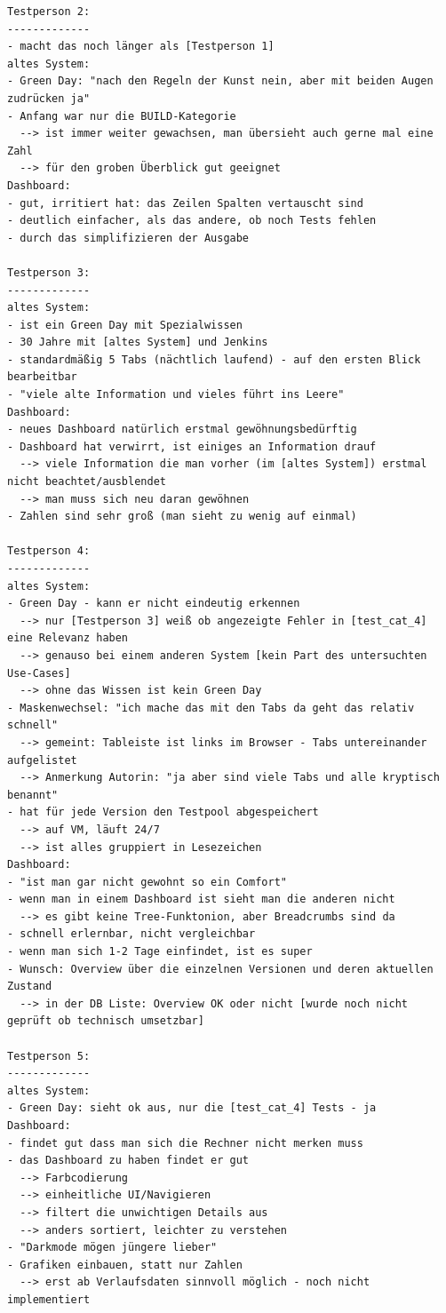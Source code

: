 \begin{lstlisting}[language={[LaTeX]TeX},inputencoding={utf8}]
Testperson 2:
-------------
- macht das noch länger als [Testperson 1]
altes System:
- Green Day: "nach den Regeln der Kunst nein, aber mit beiden Augen zudrücken ja"
- Anfang war nur die BUILD-Kategorie
  --> ist immer weiter gewachsen, man übersieht auch gerne mal eine Zahl
  --> für den groben Überblick gut geeignet
Dashboard:
- gut, irritiert hat: das Zeilen Spalten vertauscht sind
- deutlich einfacher, als das andere, ob noch Tests fehlen
- durch das simplifizieren der Ausgabe

Testperson 3:
-------------
altes System:
- ist ein Green Day mit Spezialwissen
- 30 Jahre mit [altes System] und Jenkins
- standardmäßig 5 Tabs (nächtlich laufend) - auf den ersten Blick bearbeitbar
- "viele alte Information und vieles führt ins Leere"
Dashboard:
- neues Dashboard natürlich erstmal gewöhnungsbedürftig
- Dashboard hat verwirrt, ist einiges an Information drauf
  --> viele Information die man vorher (im [altes System]) erstmal nicht beachtet/ausblendet
  --> man muss sich neu daran gewöhnen
- Zahlen sind sehr groß (man sieht zu wenig auf einmal)

Testperson 4:
-------------
altes System:
- Green Day - kann er nicht eindeutig erkennen
  --> nur [Testperson 3] weiß ob angezeigte Fehler in [test_cat_4] eine Relevanz haben
  --> genauso bei einem anderen System [kein Part des untersuchten Use-Cases]
  --> ohne das Wissen ist kein Green Day
- Maskenwechsel: "ich mache das mit den Tabs da geht das relativ schnell"
  --> gemeint: Tableiste ist links im Browser - Tabs untereinander aufgelistet
  --> Anmerkung Autorin: "ja aber sind viele Tabs und alle kryptisch benannt"
- hat für jede Version den Testpool abgespeichert
  --> auf VM, läuft 24/7
  --> ist alles gruppiert in Lesezeichen
Dashboard:
- "ist man gar nicht gewohnt so ein Comfort"
- wenn man in einem Dashboard ist sieht man die anderen nicht
  --> es gibt keine Tree-Funktonion, aber Breadcrumbs sind da
- schnell erlernbar, nicht vergleichbar
- wenn man sich 1-2 Tage einfindet, ist es super
- Wunsch: Overview über die einzelnen Versionen und deren aktuellen Zustand
  --> in der DB Liste: Overview OK oder nicht [wurde noch nicht geprüft ob technisch umsetzbar]

Testperson 5:
-------------
altes System:
- Green Day: sieht ok aus, nur die [test_cat_4] Tests - ja
Dashboard:
- findet gut dass man sich die Rechner nicht merken muss
- das Dashboard zu haben findet er gut
  --> Farbcodierung
  --> einheitliche UI/Navigieren
  --> filtert die unwichtigen Details aus
  --> anders sortiert, leichter zu verstehen
- "Darkmode mögen jüngere lieber"
- Grafiken einbauen, statt nur Zahlen
  --> erst ab Verlaufsdaten sinnvoll möglich - noch nicht implementiert


\end{lstlisting}
